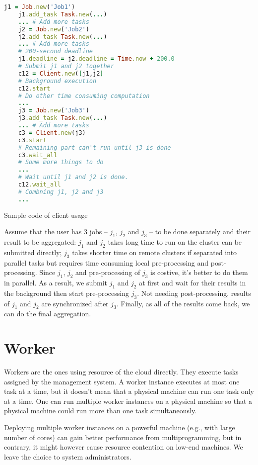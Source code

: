 {\begin{Example Code}
  \begin{spacing}{1.0}
    \begin{lstlisting}[language=Ruby]
    j1 = Job.new('Job1')
    j1.add_task Task.new(...)
    ... # Add more tasks
    j2 = Job.new('Job2')
    j2.add_task Task.new(...)
    ... # Add more tasks
    # 200-second deadline
    j1.deadline = j2.deadline = Time.now + 200.0
    # Submit j1 and j2 together
    c12 = Client.new([j1,j2]
    # Background execution
    c12.start
    # Do other time consuming computation
    ...
    j3 = Job.new('Job3')
    j3.add_task Task.new(...)
    ... # Add more tasks
    c3 = Client.new(j3)
    c3.start
    # Remaining part can't run until j3 is done
    c3.wait_all
    # Some more things to do
    ...
    # Wait until j1 and j2 is done.
    c12.wait_all
    # Combning j1, j2 and j3
    ...

    \end{lstlisting}
  \end{spacing}
  \caption{Sample code of client usage}
\end{Example Code}

Assume that the user has 3 jobs -- $j_1$, $j_2$ and $j_3$ -- to be done
separately and their result to be aggregated:  $j_1$ and $j_2$ takes
long time to run on the cluster can be submitted directly; $j_3$ takes
shorter time on remote clusters if separated into parallel tasks but
requires time consuming local pre-processing and post-processing.
Since $j_1$, $j_2$ and pre-processing of $j_3$ is costive, it's better
to do them in parallel.
As a result, we submit $j_1$ and $j_2$ at first and wait for their
results in the background then start pre-processing $j_3$. Not needing
post-processing, results of $j_1$ and $j_2$ are synchronized after
$j_3$.
Finally, as all of the results come back, we can do the final
aggregation.

\section{Worker}

Workers are the ones using resource of the cloud directly.
They execute tasks assigned by the management system.
A worker instance executes at most one task at a time, but it doesn't
mean that a physical machine can run one task only at a time.
One can run multiple worker instances on a physical machine so that a
physical machine could run more than one task simultaneously.	 

Deploying multiple worker instances on a powerful machine (e.g., with
large number of cores) can gain better performance from
multiprogramming, but in contrary, it might however cause resource
contention on low-end machines.
We leave the choice to system administrators.


}
